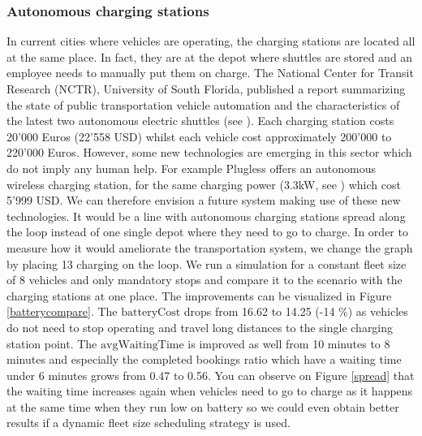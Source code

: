 \documentclass[12pt,a4paper]{article}
\begin{document}
\subsubsection{Autonomous charging stations}\label{spreadcharging}
In current cities where vehicles are operating, the charging stations are located all at the same place. In fact, they are at the depot where shuttles are stored and an employee needs to manually put them on charge. The National Center for Transit Research (NCTR), University of South Florida, published a report summarizing the state of public transportation vehicle automation and the characteristics of the latest two autonomous electric shuttles (see \cite{nctr}). Each charging station costs 20'000 Euros (22'558 USD) whilst each vehicle cost approximately 200'000 to 220'000 Euros. However, some new technologies are emerging in this sector which do not imply any human help. For example Plugless offers an autonomous wireless charging station, for the same charging power (3.3kW, see \cite{plugless}) which cost 5'999 USD. We can therefore envision a future system making use of these new technologies. It would be a line with autonomous charging stations spread along the loop instead of one single depot where they need to go to charge. In order to measure how it would ameliorate the transportation system, we change the graph by placing 13 charging on the loop. We run a simulation for a constant fleet size of 8 vehicles and only mandatory stops and compare it to the scenario with the charging stations at one place. The improvements can be visualized in Figure \ref{batterycompare}. The $\text{batteryCost}$ drops from 16.62 to 14.25 (-14 \%) as vehicles do not need to stop operating and travel long distances to the single charging station point. The $\text{avgWaitingTime}$ is improved as well from 10 minutes to 8 minutes and especially the completed bookings ratio which have a waiting time under 6 minutes grows from 0.47 to 0.56. You can observe on Figure \ref{spread} that the waiting time increases again when vehicles need to go to charge as it happens at the same time when they run low on battery so we could even obtain better results if a dynamic fleet size scheduling strategy is used. 
\end{document}

